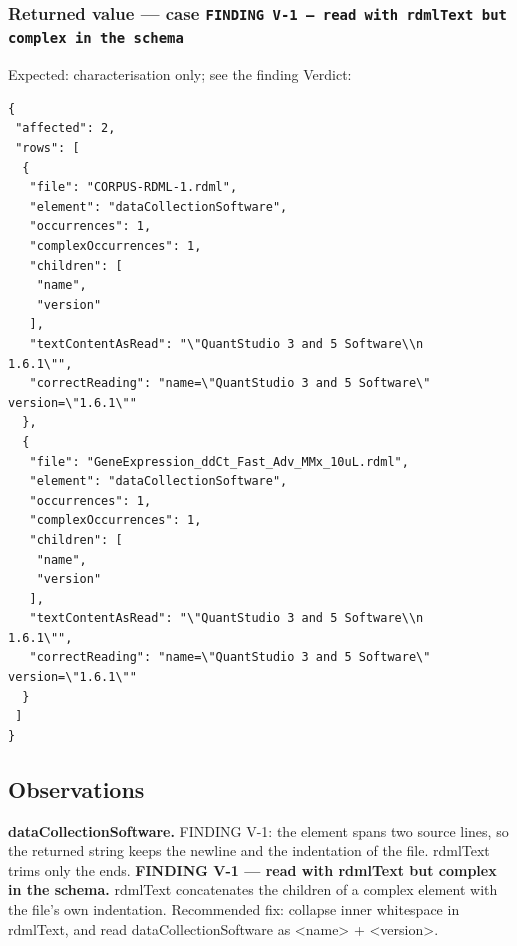 \subsubsection*{Returned value --- case \texttt{FINDING \allowbreak{}V-\allowbreak{}1 \allowbreak{}— \allowbreak{}read \allowbreak{}with \allowbreak{}rdml\allowbreak{}Text \allowbreak{}but \allowbreak{}complex \allowbreak{}in \allowbreak{}the \allowbreak{}schema}}
Expected: characterisation only; see the finding \hfill Verdict: \PASS
\begin{lstlisting}[style=jstiny]
{
 "affected": 2,
 "rows": [
  {
   "file": "CORPUS-RDML-1.rdml",
   "element": "dataCollectionSoftware",
   "occurrences": 1,
   "complexOccurrences": 1,
   "children": [
    "name",
    "version"
   ],
   "textContentAsRead": "\"QuantStudio 3 and 5 Software\\n                1.6.1\"",
   "correctReading": "name=\"QuantStudio 3 and 5 Software\" version=\"1.6.1\""
  },
  {
   "file": "GeneExpression_ddCt_Fast_Adv_MMx_10uL.rdml",
   "element": "dataCollectionSoftware",
   "occurrences": 1,
   "complexOccurrences": 1,
   "children": [
    "name",
    "version"
   ],
   "textContentAsRead": "\"QuantStudio 3 and 5 Software\\n                1.6.1\"",
   "correctReading": "name=\"QuantStudio 3 and 5 Software\" version=\"1.6.1\""
  }
 ]
}
\end{lstlisting}

\subsection*{Observations}
\textbf{data\allowbreak{}Collection\allowbreak{}Software.} FINDING \allowbreak{}V-\allowbreak{}1:\allowbreak{} \allowbreak{}the \allowbreak{}element \allowbreak{}spans \allowbreak{}two \allowbreak{}source \allowbreak{}lines,\allowbreak{} \allowbreak{}so \allowbreak{}the \allowbreak{}returned \allowbreak{}string \allowbreak{}keeps \allowbreak{}the \allowbreak{}newline \allowbreak{}and \allowbreak{}the \allowbreak{}indentation \allowbreak{}of \allowbreak{}the \allowbreak{}file.\allowbreak{} \allowbreak{}rdml\allowbreak{}Text \allowbreak{}trims \allowbreak{}only \allowbreak{}the \allowbreak{}ends.\allowbreak{}
\textbf{FINDING \allowbreak{}V-\allowbreak{}1 \allowbreak{}— \allowbreak{}read \allowbreak{}with \allowbreak{}rdml\allowbreak{}Text \allowbreak{}but \allowbreak{}complex \allowbreak{}in \allowbreak{}the \allowbreak{}schema.} rdml\allowbreak{}Text \allowbreak{}concatenates \allowbreak{}the \allowbreak{}children \allowbreak{}of \allowbreak{}a \allowbreak{}complex \allowbreak{}element \allowbreak{}with \allowbreak{}the \allowbreak{}file's \allowbreak{}own \allowbreak{}indentation.\allowbreak{} \allowbreak{}Recommended \allowbreak{}fix:\allowbreak{} \allowbreak{}collapse \allowbreak{}inner \allowbreak{}whitespace \allowbreak{}in \allowbreak{}rdml\allowbreak{}Text,\allowbreak{} \allowbreak{}and \allowbreak{}read \allowbreak{}data\allowbreak{}Collection\allowbreak{}Software \allowbreak{}as \allowbreak{}<name> \allowbreak{}+\allowbreak{} \allowbreak{}<version>.\allowbreak{}
